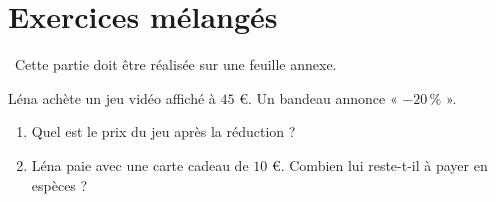 \documentclass[../../syllabus_1.tex]{subfiles}
\begin{document}
\newpage
\section{Exercices mélangés}
~Cette partie doit être réalisée sur une feuille annexe.
\setcounter{exercise}{0}

\begin{exercise}
    Léna achète un jeu vidéo affiché à $45$ €. Un bandeau annonce « $-20\,\%$ ».
    \begin{enumerate}
        \item Quel est le prix du jeu après la réduction ?
        \item Léna paie avec une carte cadeau de $10$ €. Combien lui reste-t-il à payer en espèces ?
    \end{enumerate}
\end{exercise}

\end{document}
